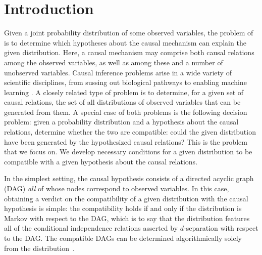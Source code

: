 \section{Introduction}

Given a joint probability distribution of some observed variables, the problem of  is to determine which hypotheses about the causal mechanism can explain the given distribution. Here, a causal mechanism may comprise both causal relations among the observed variables, as well as among these and a number of unobserved variables.
 Causal inference problems arise in a wide variety of scientific disciplines, from sussing out biological pathways to enabling machine learning \cite{pearl2009causality,spirtes2011causation,studeny2005probabilistic,koller2009probabilistic}. A closely related type of problem is to determine, for a given set of causal relations, the set of all distributions of observed variables that can be generated from them.   
A special case of both problems is the following decision problem: given a probability distribution and a hypothesis about the causal relations, determine whether the two are compatible: could the given distribution have been generated by the hypothesized causal relations? This is the problem that we focus on.
We develop necessary conditions for a given distribution to be compatible with a given hypothesis about the causal relations.


In the simplest setting, the causal hypothesis consists of a directed acyclic graph (DAG) {\em all} of whose nodes correspond to observed variables. In this case, obtaining a verdict on the compatibility of a given distribution with the causal hypothesis is simple: the compatibility holds if and only if the distribution is Markov with respect to the DAG, which is to say that the distribution features all of the conditional independence relations asserted by $d$-separation with respect to the DAG. 
The compatible DAGs can be determined algorithmically solely from the distribution~\cite{pearl2009causality}.

